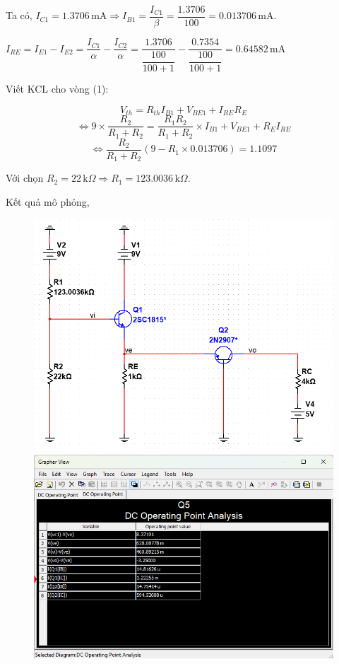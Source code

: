 Ta có, $I_{C1} = 1.3706\,\text{mA} \Rightarrow I_{B1} = \dfrac{I_{C1}}{\beta} = \dfrac{1.3706}{100} = 0.013706\,\text{mA}$.

$I_{RE} = I_{E1} - I_{E2} = \dfrac{I_{C1}}{\alpha} - \dfrac{I_{C2}}{\alpha} = \dfrac{1.3706}{\dfrac{100}{100+1}} - \dfrac{0.7354}{\dfrac{100}{100+1}} = 0.64582\,\text{mA}$

Viết KCL cho vòng (1):

\[ V_{th} = R_{th}I_{B1} + V_{BE1} + I_{RE}R_{E} \]
\[ \Leftrightarrow 9\times \dfrac{R_{2}}{R_{1} + R_{2}} = \dfrac{R_{1}R_{2}}{R_{1} + R_{2}}\times I_{B1} + V_{BE1} + R_{E}I_{RE} \]
\[ \Leftrightarrow \dfrac{R_{2}}{R_{1} + R_{2}}\left( 9 - R_{1}\times 0.013706 \right) = 1.1097 \]

Với chọn $R_{2} = 22\,\text{k}\Omega \Rightarrow R_{1} = 123.0036\,\text{k}\Omega$.

Kết quả mô phỏng,

\begin{figure}[H]
	\centering
	\begin{minipage}{.4\linewidth}
		\includegraphics[width=\linewidth]{./my-chapters/my-images/Question5/b_ketqua_R1R2.png}
	\end{minipage}
	\begin{minipage}{.4\linewidth}
		\includegraphics[width=\linewidth]{./my-chapters/my-images/Question5/b_ketqua.png}
	\end{minipage}
\end{figure}

